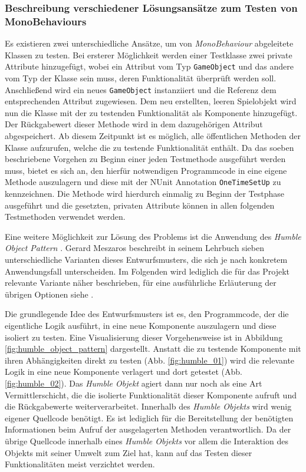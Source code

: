 \subsubsection{Beschreibung verschiedener Lösungsansätze zum Testen von MonoBehaviours}
\label{chapter:mono_beh_testen_loesungen}

Es existieren zwei unterschiedliche Ansätze, um von \textit{MonoBehaviour} abgeleitete Klassen zu testen. Bei ersterer Möglichkeit werden einer Testklasse zwei private Attribute hinzugefügt, wobei ein Attribut vom Typ \texttt{GameObject} und das andere vom Typ der Klasse sein muss, deren Funktionalität überprüft werden soll. Anschließend wird ein neues \texttt{GameObject} instanziiert und die Referenz dem entsprechenden Attribut zugewiesen. Dem neu erstellten, leeren Spielobjekt wird nun die Klasse mit der zu testenden Funktionalität als Komponente hinzugefügt. Der Rückgabewert dieser Methode wird in dem dazugehörigen Attribut abgespeichert. Ab diesem Zeitpunkt ist es möglich, alle öffentlichen Methoden der Klasse aufzurufen, welche die zu testende Funktionalität enthält. Da das soeben beschriebene Vorgehen zu Beginn einer jeden Testmethode ausgeführt werden muss, bietet es sich an, den hierfür notwendigen Programmcode in eine eigene Methode auszulagern und diese mit der NUnit Annotation \texttt{OneTimeSetUp} zu kennzeichnen. Die Methode wird hierdurch einmalig zu Beginn der Testphase ausgeführt und die gesetzten, privaten Attribute können in allen folgenden Testmethoden verwendet werden. 

Eine weitere Möglichkeit zur Lösung des Problems ist die Anwendung des \textit{Humble Object Pattern} \cite{xUnit_Test_Patterns_Refactoring}. Gerard Meszaros beschreibt in seinem Lehrbuch sieben unterschiedliche Varianten dieses Entwurfsmusters, die sich je nach konkretem Anwendungsfall unterscheiden. Im Folgenden wird lediglich die für das Projekt relevante Variante näher beschrieben, für eine ausführliche Erläuterung der übrigen Optionen siehe \cite{xUnit_Test_Patterns_Refactoring}.

Die grundlegende Idee des Entwurfsmusters ist es, den Programmcode, der die eigentliche Logik ausführt, in eine neue Komponente auszulagern und diese isoliert zu testen. Eine Visualisierung dieser Vorgehensweise ist in Abbildung  \ref{fig:humble_object_pattern} dargestellt. Anstatt die zu testende Komponente mit ihren Abhängigkeiten direkt zu testen (Abb. \ref{fig:humble_01}) wird die relevante Logik in eine neue Komponente verlagert und dort getestet (Abb. \ref{fig:humble_02}). Das \textit{Humble Objekt} agiert dann nur noch als eine Art Vermittlerschicht, die die isolierte Funktionalität dieser Komponente aufruft und die Rückgabewerte weiterverarbeitet. Innerhalb des \textit{Humble Objekts} wird wenig eigener Quellcode benötigt. Es ist lediglich für die Bereitstellung der benötigten Informationen beim Aufruf der ausgelagerten Methoden verantwortlich. Da der übrige Quellcode innerhalb eines \textit{Humble Objekts} vor allem die Interaktion des Objekts mit seiner Umwelt zum Ziel hat, kann auf das Testen dieser Funktionalitäten meist verzichtet werden. 


